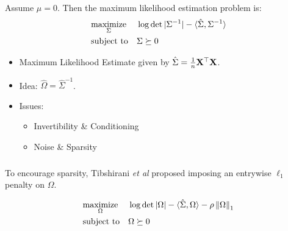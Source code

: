 \begin{frame}[fragile] \frametitle{}
\end{frame}
\begin{frame}[fragile] \frametitle{}
    \vspace{0.5cm}

    Assume $\mu = 0$.  Then the maximum likelihood estimation problem is:
	\begin{align*}
		&\underset{\Sigma}{\text{maximize}} && 
            \log\det|\Sigma^{-1}| - \langle \hat\Sigma, \Sigma^{-1} \rangle
		\\ &\text{subject to} && \Sigma \succeq 0
	\end{align*}
    \vspace{-0.8cm}
    \begin{itemize}
        \item Maximum Likelihood Estimate given by $\hat\Sigma = 
            \frac{1}{n} \mathbf{X}^\top \mathbf{X}$.
        \item Idea: $\hat\Omega = \hat\Sigma^{-1}$.
        \item Issues:
            \begin{itemize}
                \item Invertibility \& Conditioning
                \item Noise \& Sparsity
            \end{itemize}
    \end{itemize}
\end{frame}
\begin{frame}[fragile] \frametitle{}

    \vspace{0.6cm}
    To encourage sparsity, Tibshirani \textit{et al} proposed imposing an
    entrywise $\ell_1$ penalty on $\Omega$.

    \begin{align*}
        &\underset{\Omega}{\text{maximize}} && 
            \log\det|\Omega| - \langle \hat\Sigma, \Omega \rangle
            - \rho \left\lVert\Omega\right\rVert_1
        \\ &\text{subject to} && \Omega \succeq 0
    \end{align*}
\end{frame}
